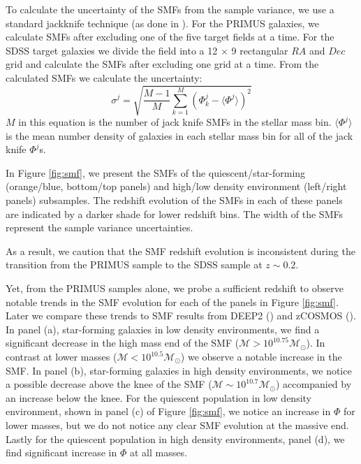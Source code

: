 \documentclass{emulateapj}
\begin{document}
To calculate the uncertainty of the SMFs from the sample variance, we use a standard jackknife technique (as done in \cite{Moustakas:2013aa}). For the PRIMUS galaxies, we calculate SMFs after excluding one of the five target fields at a time. For the SDSS target galaxies we divide the field into a 12 $\times$ 9 rectangular $RA$ and $Dec$ grid and calculate the SMFs after excluding one grid at a time. From the calculated SMFs we calculate the uncertainty: 
\begin{equation}
\sigma^j = \sqrt{\frac{M-1}{M} \sum\limits_{k=1}^{M} (\Phi^j_k - \langle \Phi^j \rangle)^2}
\end{equation} 
$M$ in this equation is the number of jack knife SMFs in the stellar mass bin. $\langle \Phi^j \rangle$ is the mean number density of galaxies in each stellar mass bin for all of the jack knife $\Phi^j$s. 

In Figure \ref{fig:smf}, we present the SMFs of the quiescent/star-forming (orange/blue, bottom/top panels) and high/low density environment (left/right panels) subsamples. The redshift evolution of the SMFs in each of these panels are indicated by a darker shade for lower redshift bins. The width of the SMFs represent the sample variance uncertainties.

As a result, we caution that the SMF redshift evolution is inconsistent during the transition from the PRIMUS sample to the SDSS sample at $z \sim 0.2$. 

Yet, from the PRIMUS samples alone, we probe a sufficient redshift to observe notable trends in the SMF evolution for each of the panels in Figure \ref{fig:smf}. Later we compare these trends to SMF results from DEEP2 (\cite{bundy06a}) and zCOSMOS (\cite{Bolzonella:2010aa}). In panel (a), star-forming galaxies in low density environments, we find a significant decrease in the high mass end of the SMF ($\mathcal{M} > 10^{10.75} \mathcal{M}_{\odot}$). In contrast at lower masses ($\mathcal{M} < 10^{10.5} \mathcal{M}_{\odot}$) we observe a notable increase in the SMF. In panel (b), star-forming galaxies in high density environments, we notice a possible decrease above the knee of the SMF ($\mathcal{M} \sim 10^{10.7} \mathcal{M}_{\odot}$) accompanied by an increase below the knee. For the quiescent population in low density environment, shown in panel (c) of Figure \ref{fig:smf}, we notice an increase in $\Phi$ for lower masses, but we do not notice any clear SMF evolution at the massive end. Lastly for the quiescent population in high density environments, panel (d), we find significant increase in $\Phi$ at all masses. 
\end{document}
